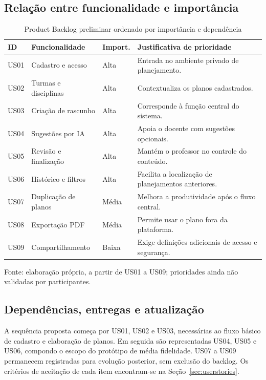 \documentclass[12pt,a4paper,oneside]{report}
\begin{document}
\subsection{Relação entre funcionalidade e importância}
\begin{table}[htbp]
\centering
\caption{Product Backlog preliminar ordenado por importância e dependência}
\label{tab:productbacklog}
\footnotesize
\renewcommand{\arraystretch}{1.25}
\begin{tabularx}{\textwidth}{@{}>{\RaggedRight\arraybackslash}p{0.9cm}>{\RaggedRight\arraybackslash}p{3.2cm}>{\RaggedRight\arraybackslash}p{1.2cm}>{\RaggedRight\arraybackslash}X@{}}
\toprule
\textbf{ID} & \textbf{Funcionalidade} & \textbf{Import.} & \textbf{Justificativa de prioridade} \\
\midrule
US01 & Cadastro e acesso & Alta & Entrada no ambiente privado de planejamento. \\
US02 & Turmas e disciplinas & Alta & Contextualiza os planos cadastrados. \\
US03 & Criação de rascunho & Alta & Corresponde à função central do sistema. \\
US04 & Sugestões por IA & Alta & Apoia o docente com sugestões opcionais. \\
US05 & Revisão e finalização & Alta & Mantém o professor no controle do conteúdo. \\
US06 & Histórico e filtros & Alta & Facilita a localização de planejamentos anteriores. \\
US07 & Duplicação de planos & Média & Melhora a produtividade após o fluxo central. \\
US08 & Exportação PDF & Média & Permite usar o plano fora da plataforma. \\
US09 & Compartilhamento & Baixa & Exige definições adicionais de acesso e segurança. \\
\bottomrule
\end{tabularx}
\par\smallskip
\begin{minipage}{\textwidth}\footnotesize Fonte: elaboração própria, a partir de US01 a US09; prioridades ainda não validadas por participantes.\end{minipage}
\end{table}

\subsection{Dependências, entregas e atualização}
A sequência proposta começa por US01, US02 e US03, necessárias ao fluxo básico de cadastro e elaboração de planos. Em seguida são representadas US04, US05 e US06, compondo o escopo do protótipo de média fidelidade. US07 a US09 permanecem registradas para evolução posterior, sem exclusão do backlog. Os critérios de aceitação de cada item encontram-se na Seção~\ref{sec:userstories}.
\end{document}
